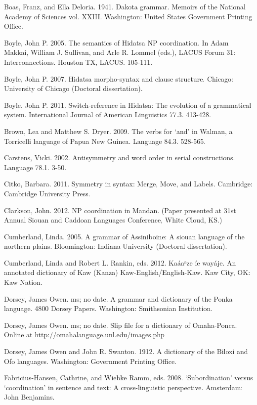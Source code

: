 \documentclass[output=paper]{LSP/langsci}
\begin{document}
\begin{reflist}

Boas, Franz, and Ella Deloria. 1941. Dakota grammar. Memoirs of the National Academy of Sciences vol. XXIII. Washington: United States Government Printing Office.

Boyle, John P. 2005. The semantics of Hidatsa NP coordination. In Adam Makkai, William J. Sullivan, and Arle R. Lommel (eds.), LACUS Forum 31: Interconnections. Houston TX, LACUS. 105-111.

Boyle, John P. 2007. Hidatsa morpho-syntax and clause structure. Chicago: University of Chicago (Doctoral dissertation).

Boyle, John P. 2011. Switch-reference in Hidatsa: The evolution of a grammatical system. International Journal of American Linguistics 77.3. 413-428.

Brown, Lea and Matthew S. Dryer. 2009. The verbs for `and' in Walman, a Torricelli language of Papua New Guinea. Language 84.3. 528-565.

Carstens, Vicki. 2002. Antisymmetry and word order in serial constructions. Language 78.1. 3-50.

Citko, Barbara. 2011. Symmetry in syntax: Merge, Move, and Labels. Cambridge: Cambridge University Press.

Clarkson, John. 2012. NP coordination in Mandan. (Paper presented at 31st Annual Siouan and Caddoan Languages Conference, White Cloud, KS.)

Cumberland, Linda. 2005. A grammar of Assiniboine: A siouan language of the northern plains. Bloomington: Indiana University (Doctoral dissertation). 

Cumberland, Linda and Robert L. Rankin, eds. 2012. Ka\'aaⁿze \'ie way\'aje. An annotated dictionary of Kaw (Kanza) Kaw-English/English-Kaw.  Kaw City, OK: Kaw Nation.  

Dorsey, James Owen. ms; no date. A grammar and dictionary of the Ponka language. 4800 Dorsey Papers. Washington: Smithsonian Institution.

Dorsey, James Owen. ms; no date. Slip file for a dictionary of Omaha-Ponca. Online at http://omahalanguage.unl.edu/images.php

Dorsey, James Owen and John R. Swanton. 1912. A dictionary of the Biloxi and Ofo languages. Washington: Government Printing Office.

Fabricius-Hansen, Cathrine, and Wiebke Ramm, eds. 2008. `Subordination' versus `coordination' in sentence and text: A cross-linguistic perspective. Amsterdam: John Benjamins.


\end{reflist}
\end{document}
